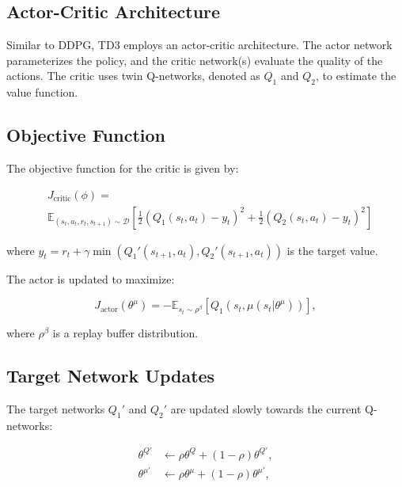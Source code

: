 \documentclass[conference]{IEEEtran}
\begin{document}
\subsection{Actor-Critic Architecture}

Similar to DDPG, TD3 employs an actor-critic architecture. The actor network parameterizes the policy, and the critic network(s) evaluate the quality of the actions. The critic uses twin Q-networks, denoted as $Q_1$ and $Q_2$, to estimate the value function.

\subsection{Objective Function}

The objective function for the critic is given by:

\begin{align}
    &J_{\text{critic}}(\phi) =\\ &\mathbb{E}_{(s_t, a_t, r_t, s_{t+1}) \sim \mathcal{D}} \left[ \frac{1}{2} \left( Q_1(s_t, a_t) - y_t \right)^2 + \frac{1}{2} \left( Q_2(s_t, a_t) - y_t \right)^2 \right]
\end{align}
    

where $y_t = r_t + \gamma \min(Q_1'(s_{t+1}, a_t), Q_2'(s_{t+1}, a_t))$ is the target value.

The actor is updated to maximize:

\begin{equation}
J_{\text{actor}}(\theta^{\mu}) = -\mathbb{E}_{s_t \sim \rho^{\beta}} \left[ Q_1(s_t, \mu(s_t|\theta^{\mu})) \right],
\end{equation}

where $\rho^{\beta}$ is a replay buffer distribution.

\subsection{Target Network Updates}

The target networks $Q_1'$ and $Q_2'$ are updated slowly towards the current Q-networks:

\begin{equation}
\begin{split}
\theta^{Q'} &\leftarrow \rho \theta^Q + (1 - \rho) \theta^{Q'}, \\
\theta^{\mu'} &\leftarrow \rho \theta^{\mu} + (1 - \rho) \theta^{\mu'},
\end{split}
\end{equation}
\end{document}
